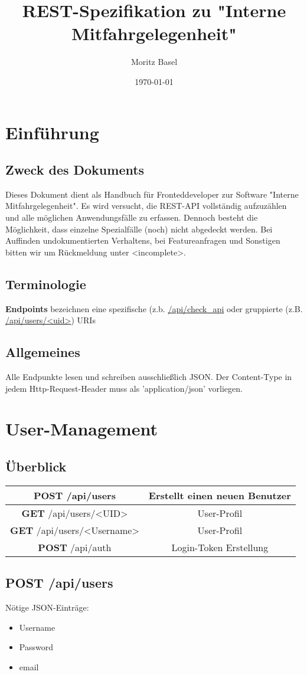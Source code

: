 \documentclass[11pt,a4paper]{article}
\author{Moritz Basel}
\title{REST-Spezifikation zu "Interne Mitfahrgelegenheit"}
\date{\today{}}
\begin{document}
\normalfont
\maketitle{}
\tableofcontents{}
\section{Einführung}
\subsection{Zweck des Dokuments}
Dieses Dokument dient als Handbuch für Fronteddeveloper zur Software "Interne Mitfahrgelegenheit". Es wird versucht, die REST-API vollständig aufzuzählen und alle möglichen Anwendungsfälle zu erfassen.
Dennoch besteht die Möglichkeit, dass einzelne Spezialfälle (noch) nicht abgedeckt werden. Bei Auffinden undokumentierten Verhaltens, bei Featureanfragen und Sonstigen bitten wir um Rückmeldung unter <incomplete>.
\subsection{Terminologie}
\textbf{Endpoints} bezeichnen eine spezifische (z.b. \url{/api/check_api} oder gruppierte (z.B. \url{/api/users/<uid>}) URIs
\subsection{Allgemeines}
Alle Endpunkte lesen und schreiben ausschließlich JSON. Der Content-Type in jedem Http-Request-Header muss als 'application/json' vorliegen.

\section{User-Management}
\subsection{Überblick}
\begin{tabular}{|c|c|}
\hline
\textbf{POST} /api/users & Erstellt einen neuen Benutzer \\
\hline
\textbf{GET} /api/users/<UID> & User-Profil \\
\hline
\textbf{GET} /api/users/<Username> & User-Profil \\
\hline
\textbf{POST} /api/auth & Login-Token Erstellung \\
\hline
\end{tabular}
\subsection{\textbf{POST} /api/users}
Nötige JSON-Einträge:
\begin{itemize}
\item Username
\item Password
\item email
\end{itemize}
\end{document}
